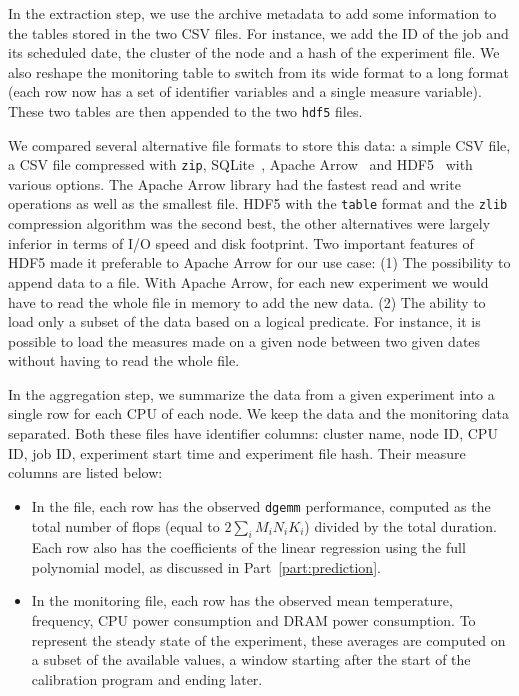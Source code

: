                 In the extraction step, we use the archive metadata to add some information to the tables stored in the
                two CSV files. For instance, we add the ID of the job and its scheduled date, the cluster of the node
                and a hash of the experiment file. We also reshape the monitoring table to switch from its wide format
                to a long format (\ie each row now has a set of identifier variables and a single measure variable).
                These two tables are then appended to the two \texttt{hdf5} files.

                We compared several alternative file formats to store this data: a simple CSV file, a CSV file
                compressed with \texttt{zip}, SQLite~\cite{sqlite}, Apache Arrow~\cite{arrow} and HDF5~\cite{hdf5} with
                various options. The Apache Arrow library had the fastest read and write operations as well as the
                smallest file. HDF5 with the \texttt{table} format and the \texttt{zlib} compression algorithm was the
                second best, the other alternatives were largely inferior in terms of I/O speed and disk footprint. Two
                important features of HDF5 made it preferable to Apache Arrow for our use case:
                (1) The possibility to append data to a file. With Apache Arrow, for each new experiment we would have
                to read the whole file in memory to add the new data.  (2) The ability to load only a subset of the data
                based on a logical predicate. For instance, it is possible to load the measures made on a given node
                between two given dates without having to read the whole file.

                In the aggregation step, we summarize the data from a given experiment into a single row for each CPU of
                each node. We keep the \dgemm data and the monitoring data separated. Both these files have identifier
                columns: cluster name, node ID, CPU ID, job ID, experiment start time and experiment file hash. Their
                measure columns are listed below:
                \begin{itemize}
                    \item In the \dgemm file, each row has the observed \texttt{dgemm} performance, computed as the
                        total number of flops (equal to \(2\sum_i M_iN_iK_i\)) divided by the total duration. Each row
                        also has the coefficients of the linear regression using the full polynomial model, as discussed
                        in Part~\ref{part:prediction}.
                    \item In the monitoring file, each row has the observed mean temperature, frequency, CPU power
                        consumption and DRAM power consumption. To represent the steady state of the experiment, these
                        averages are computed on a subset of the available values, a window starting 
                        after the start of the \dgemm calibration program and ending  later.
                \end{itemize}

